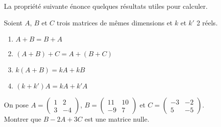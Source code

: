 \documentclass[a4paper,12pt]{book}
\begin{document}
La propriété suivante énonce quelques résultats utiles pour calculer.
\begin{propriete}
Soient $A$, $B$ et $C$ trois matrices de mêmes dimensions et $k$ et $k'$ 2 réels.
\begin{enumerate}[\textbullet]
	\item 	$A+B = B+A$
	\item 	$(A+B)+C = A+(B+C)$
	\item 	$k(A+B) = kA + kB$
	\item 	$(k+k')A = kA+k'A$
\end{enumerate}
\end{propriete}

\begin{exercice}[]
On pose $A=\begin{pmatrix}
1&2\\3&-4
\end{pmatrix}$, $B=\begin{pmatrix}
11&10\\-9&7
\end{pmatrix}$ et $C=\begin{pmatrix}
-3&-2\\5&-5
\end{pmatrix}$.\\

Montrer que $B-2A+3C$ est une matrice nulle.
\end{exercice}
\end{document}
